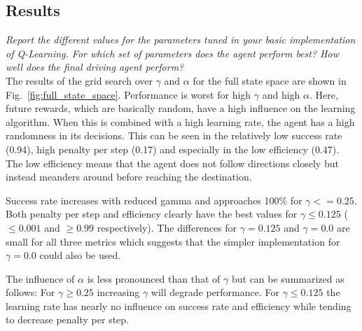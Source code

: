 \documentclass[11pt]{article}
\begin{document}
\subsection{Results}
\textit{Report the different values for the parameters tuned in your basic implementation of Q-Learning. For which set of parameters does the agent perform best? How well does the final driving agent perform?}\\

The results of the grid search over $\gamma$ and $\alpha$ for the full state space are shown in Fig.~\ref{fig:full_state_space}. Performance is worst for high $\gamma$ and high $\alpha$. Here, future rewards, which are basically random, have a high influence on the learning algorithm. When this is combined with a high learning rate, the agent has a high randomness in its decisions. This can be seen in the relatively low success rate (0.94), high penalty per step (0.17) and especially in the low efficiency (0.47). The low efficiency means that the agent does not follow directions closely but instead meanders around before reaching the destination.

Success rate increases with reduced gamma and approaches 100\% for $\gamma <= 0.25$. Both penalty per step and efficiency clearly have the best values for $\gamma \le 0.125$ ($\le 0.001$ and $\ge 0.99$ respectively). The differences for $\gamma = 0.125$ and $\gamma = 0.0$ are small for all three metrics which suggests that the simpler implementation for $\gamma = 0.0$ could also be used. 

The influence of $\alpha$ is less pronounced than that of $\gamma$ but can be summarized as follows: For $\gamma \ge 0.25$ increasing $\gamma$ will degrade performance. For $\gamma \le 0.125$ the learning rate has nearly no influence on success rate and efficiency while tending to decrease penalty per step. 
\end{document}
